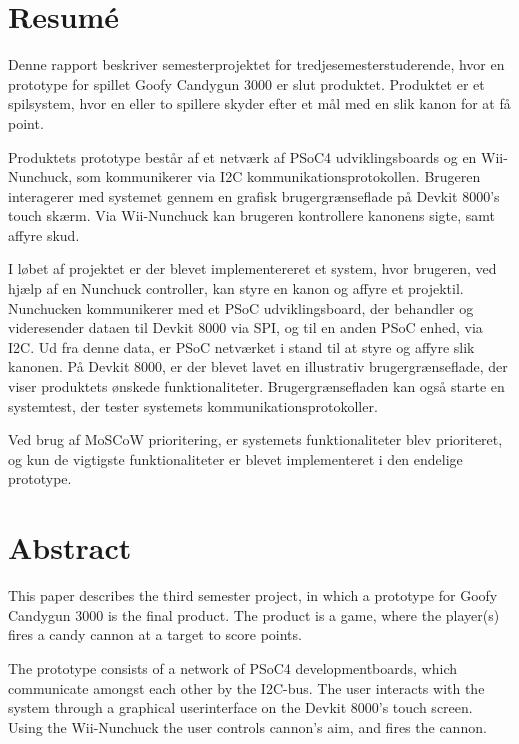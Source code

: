 \chapter{Resumé}
Denne rapport beskriver semesterprojektet for tredjesemesterstuderende, hvor en prototype for spillet Goofy Candygun 3000 er slut produktet. Produktet er et spilsystem, hvor en eller to spillere skyder efter et mål med en slik kanon for at få point.\newline

\noindent Produktets prototype består af et netværk af PSoC4 udviklingsboards og en Wii-Nunchuck, som kommunikerer via I2C kommunikationsprotokollen. Brugeren interagerer med systemet gennem en grafisk brugergrænseflade på Devkit 8000's touch skærm. Via Wii-Nunchuck kan brugeren kontrollere kanonens sigte, samt affyre skud. \newline

\noindent I løbet af projektet er der blevet implementereret et system, hvor brugeren, ved hjælp af en Nunchuck controller, kan styre en kanon og affyre et projektil. Nunchucken kommunikerer med et PSoC udviklingsboard, der behandler og videresender dataen til Devkit 8000 via SPI, og til en anden PSoC enhed, via I2C. Ud fra denne data, er PSoC netværket i stand til at styre og affyre slik kanonen. På Devkit 8000, er der blevet lavet en illustrativ brugergrænseflade, der viser produktets ønskede funktionaliteter. Brugergrænsefladen kan også starte en systemtest, der tester systemets kommunikationsprotokoller.\newline
 
\noindent Ved brug af MoSCoW prioritering, er systemets funktionaliteter blev prioriteret, og kun de vigtigste funktionaliteter er blevet implementeret i den endelige prototype. \newline

\chapter{Abstract}
This paper describes the third semester project, in which a prototype for Goofy Candygun 3000 is the final product. The product is a game, where the player(s) fires a candy cannon at a target to score points.  \newline

\noindent The prototype consists of a network of PSoC4 developmentboards, which communicate amongst each other by the I2C-bus. The user interacts with the system through a graphical userinterface on the Devkit 8000's touch screen. Using the Wii-Nunchuck the user controls cannon's aim, and fires the cannon. \newline

